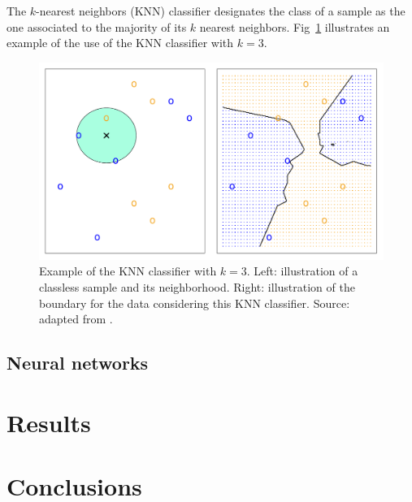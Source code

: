 \documentclass[conference]{IEEEtran}
\begin{document}
The $k$-nearest neighbors (KNN) classifier designates the class of a sample as the one associated to the majority of its $k$ nearest neighbors. Fig~\ref{fig:knn} illustrates an example of the use of the KNN classifier with $k=3$. 
%
\begin{figure}
  \includegraphics[width=\columnwidth]{../figures/esl_2_14}
  \caption{Example of the KNN classifier with $k=3$. Left: illustration of a classless sample and its neighborhood. Right: illustration of the boundary for the data considering this KNN classifier. Source: adapted from \cite{james2013}.}
  \label{fig:knn}
\end{figure}

\subsection{Neural networks}


\section{Results} \label{sec:results}






\section{Conclusions}\label{sec:conclusions}

\end{document}
